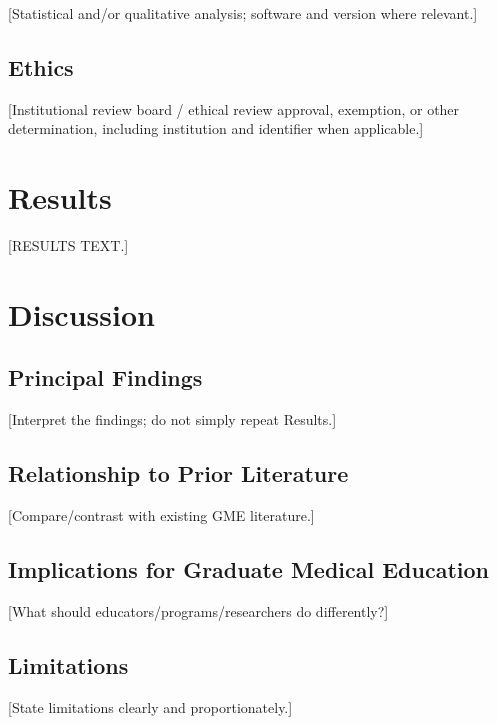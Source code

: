 \documentclass[12pt]{article}
\begin{document}
[Statistical and/or qualitative analysis; software and version where relevant.]

\subsection{Ethics}

[Institutional review board / ethical review approval, exemption, or other
	determination, including institution and identifier when applicable.]

\section{Results}


 [RESULTS TEXT.]

\section{Discussion}

\subsection{Principal Findings}

[Interpret the findings; do not simply repeat Results.]

\subsection{Relationship to Prior Literature}

[Compare/contrast with existing GME literature.]

\subsection{Implications for Graduate Medical Education}

[What should educators/programs/researchers do differently?]

\subsection{Limitations}

[State limitations clearly and proportionately.]
\end{document}
